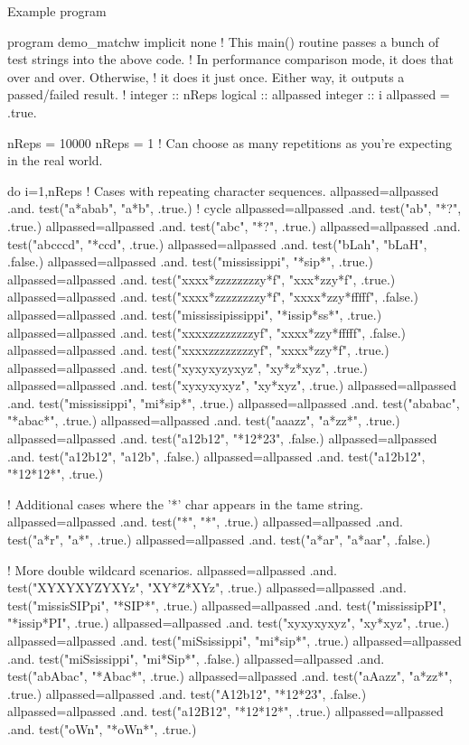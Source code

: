 Example program \begin{DoxyVerb}program demo_matchw
implicit none
! This main() routine passes a bunch of test strings into the above code.
! In performance comparison mode, it does that over and over. Otherwise,
! it does it just once. Either way, it outputs a passed/failed result.
!
integer :: nReps
logical :: allpassed
integer :: i
 allpassed = .true.

 nReps = 10000
 nReps = 1     ! Can choose as many repetitions as you're expecting in the real world.

 do i=1,nReps
  ! Cases with repeating character sequences.
  allpassed=allpassed .and. test("a*abab", "a*b", .true.)
  ! cycle
  allpassed=allpassed .and. test("ab", "*?", .true.)
  allpassed=allpassed .and. test("abc", "*?", .true.)
  allpassed=allpassed .and. test("abcccd", "*ccd", .true.)
  allpassed=allpassed .and. test("bLah", "bLaH", .false.)
  allpassed=allpassed .and. test("mississippi", "*sip*", .true.)
  allpassed=allpassed .and. test("xxxx*zzzzzzzzy*f", "xxx*zzy*f", .true.)
  allpassed=allpassed .and. test("xxxx*zzzzzzzzy*f", "xxxx*zzy*fffff", .false.)
  allpassed=allpassed .and. test("mississipissippi", "*issip*ss*", .true.)
  allpassed=allpassed .and. test("xxxxzzzzzzzzyf", "xxxx*zzy*fffff", .false.)
  allpassed=allpassed .and. test("xxxxzzzzzzzzyf", "xxxx*zzy*f", .true.)
  allpassed=allpassed .and. test("xyxyxyzyxyz", "xy*z*xyz", .true.)
  allpassed=allpassed .and. test("xyxyxyxyz", "xy*xyz", .true.)
  allpassed=allpassed .and. test("mississippi", "mi*sip*", .true.)
  allpassed=allpassed .and. test("ababac", "*abac*", .true.)
  allpassed=allpassed .and. test("aaazz", "a*zz*", .true.)
  allpassed=allpassed .and. test("a12b12", "*12*23", .false.)
  allpassed=allpassed .and. test("a12b12", "a12b", .false.)
  allpassed=allpassed .and. test("a12b12", "*12*12*", .true.)

  ! Additional cases where the '*' char appears in the tame string.
  allpassed=allpassed .and. test("*", "*", .true.)
  allpassed=allpassed .and. test("a*r", "a*", .true.)
  allpassed=allpassed .and. test("a*ar", "a*aar", .false.)

  ! More double wildcard scenarios.
  allpassed=allpassed .and. test("XYXYXYZYXYz", "XY*Z*XYz", .true.)
  allpassed=allpassed .and. test("missisSIPpi", "*SIP*", .true.)
  allpassed=allpassed .and. test("mississipPI", "*issip*PI", .true.)
  allpassed=allpassed .and. test("xyxyxyxyz", "xy*xyz", .true.)
  allpassed=allpassed .and. test("miSsissippi", "mi*sip*", .true.)
  allpassed=allpassed .and. test("miSsissippi", "mi*Sip*", .false.)
  allpassed=allpassed .and. test("abAbac", "*Abac*", .true.)
  allpassed=allpassed .and. test("aAazz", "a*zz*", .true.)
  allpassed=allpassed .and. test("A12b12", "*12*23", .false.)
  allpassed=allpassed .and. test("a12B12", "*12*12*", .true.)
  allpassed=allpassed .and. test("oWn", "*oWn*", .true.)


\end{DoxyVerb}
